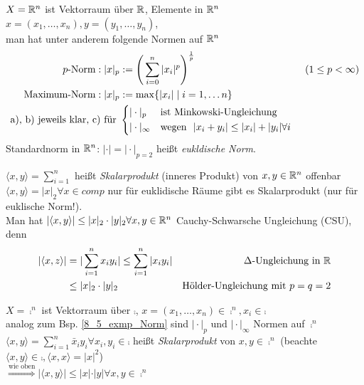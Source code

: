 \begin{exmpn}\label{8_5_exmp_Norm}
    $X=\mathbb{R}^n$ ist Vektorraum über $\mathbb{R}$, Elemente in $\mathbb{R}^n$\\ $x=(x_1,\dots,x_n), y=(y_1, \dots, y_n)$,\\ man hat unter anderem folgende Normen auf $\mathbb{R}^n$
    \begin{align*}
        p\text{-Norm}: \vert x \vert_p& := \Bigg( \sum_{i=0}^{n} \vert x_i \vert^p \Bigg)^{\frac{1}{p}} & (1\leq p < \infty)\\
        \text{Maximum-Norm}: \vert x \vert_p& := \max\{\vert x_i \vert \mid i=1,\dots n\} &\\
        \text{a), b) jeweils klar, c) für } & 
        \begin{cases*}
            \vert \cdot \vert_p & \text{ist Minkowski-Ungleichung}\\
            \vert \cdot \vert_{\infty} & \text{wegen } $\vert x_i + y_i \vert \leq \vert x_i \vert + \vert y_i \vert \forall i$
        \end{cases*}
    \end{align*}
    Standardnorm in $\mathbb{R}^n$:
	$\vert \cdot \vert = \vert \cdot \vert_{p=2}$ heißt \emph{eukldische Norm}.\\
\end{exmpn}

\begin{mydefn}[Skalarprodukt]
    $\langle x,y \rangle = \sum_{i=1}^{n}$ heißt \emph{Skalarprodukt} (inneres Produkt) von $x,y \in \mathbb{R}^n$ offenbar $\langle x,y \rangle = \vert x \vert_2 \forall x \in comp$ nur für euklidische Räume gibt es Skalarprodukt (nur für euklische Norm!).\\
    Man hat $\vert \langle x,y\rangle \vert \leq \vert x \vert_2 \cdot \vert y \vert_2 \forall x,y \in \mathbb{R}^n$ Cauchy-Schwarsche Ungleichung (CSU), denn
    \begin{align*}
        \vert \langle x,z \rangle \vert &= \vert \sum_{i=1}^{n} x_i y_i \vert \leq  \sum_{i=1}^{n}\vert x_i y_i\vert & \Delta\text{-Ungleichung in } \mathbb{R}\\
        & \leq \vert x \vert_2 \cdot\vert y \vert_2 & \text{Hölder-Ungleichung mit } p=q=2
    \end{align*}
\end{mydefn}

\begin{exmpn}
	$X=\comp^n$ ist Vektorraum über $\comp$, $x=(x_1,\dots,x_n) \in\comp^n, x_i \in \comp$\\
    analog zum Bsp. \ref{8_5_exmp_Norm} sind $\vert \cdot \vert_{p} \text{ und } \vert \cdot \vert_{\infty}$ Normen auf $\comp^n$\\
    $\langle x,y\rangle = \sum_{i=1}^{n} \bar{x}_i y_i\forall x_i, y_i \in \comp$ heißt \emph{Skalarprodukt} von $x,y \in \comp^n$ (beachte $\langle x,y\rangle \in \comp, \langle x,x \rangle=\vert x \vert^2$) \\
    $\overset{\text{wie oben}}{\Rightarrow} \vert \langle x,y\rangle \vert \leq \vert x \vert\cdot \vert y \vert \forall x,y \in \comp^n$
\end{exmpn}

